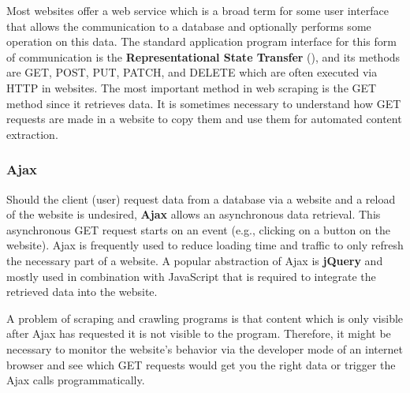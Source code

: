 Most websites offer a web service which is a broad term for some user interface that allows the communication to a database and optionally performs some operation on this data. The standard application program interface for this form of communication is the \textbf{Representational State Transfer} (), and its methods are GET, POST, PUT, PATCH, and DELETE which are often executed via HTTP in websites. The most important method in web scraping is the GET method since it retrieves data. It is sometimes necessary to understand how GET requests are made in a website to copy them and use them for automated content extraction.

\subsubsection{Ajax}

Should the client (user) request data from a database via a website and a reload of the website is undesired, \textbf{Ajax} allows an asynchronous data retrieval. This asynchronous GET request starts on an event (e.g., clicking on a button on the website). Ajax is frequently used to reduce loading time and traffic to only refresh the necessary part of a website. A popular abstraction of Ajax is \textbf{jQuery} and mostly used in combination with JavaScript that is required to integrate the retrieved data into the website.

A problem of scraping and crawling programs is that content which is only visible after Ajax has requested it is not visible to the program. Therefore, it might be necessary to monitor the website's behavior via the developer mode of an internet browser and see which GET requests would get you the right data or trigger the Ajax calls programmatically.

